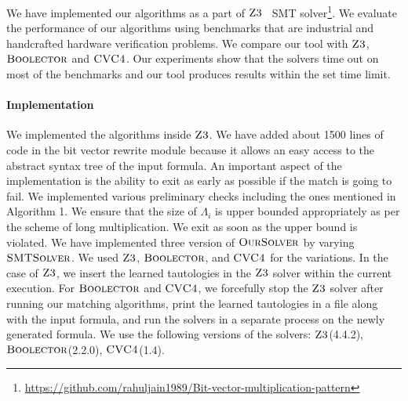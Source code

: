 

We have implemented our algorithms as a part of $\textsc{Z3}$~\cite{z3} SMT solver\footnote{\url{https://github.com/rahuljain1989/Bit-vector-multiplication-pattern}}.
%
 We evaluate the performance of our algorithms using benchmarks that are industrial and handcrafted hardware verification problems.
%
We compare our tool with $\textsc{Z3}$, $\textsc{Boolector}$\cite{boolector} and $\textsc{CVC4}$\cite{cvc4}.
%
Our experiments show that the solvers time out on most of the benchmarks and our tool produces results within the set time limit.

\paragraph{\bf Implementation}
We implemented the algorithms inside $\textsc{Z3}$. We have added about 1500 lines of code in the bit vector rewrite module because it allows an easy access to the abstract syntax tree of the input formula.
%
An important aspect of the implementation is the ability to exit as early as possible if the match is going to fail.
%
We implemented various preliminary checks including the ones mentioned in Algorithm 1. We ensure that the size of $\Lambda_i$ is upper bounded appropriately as per the scheme of long multiplication. We exit as soon as the upper bound is violated. 
%
We have implemented three version of $\textsc{OurSolver}$ by varying
$\textsc{SMTSolver}$.
%
We used  $\textsc{Z3}$, $\textsc{Boolector}$, and $\textsc{CVC4}$ for the variations. 
%
In the case of $\textsc{Z3}$,
we insert the learned tautologies in the $\textsc{Z3}$ solver within the current execution.
%
For $\textsc{Boolector}$ and $\textsc{CVC4}$,
we forcefully stop the $\textsc{Z3}$ solver after running our matching algorithms,
print the learned tautologies in a file along with the input formula, and
run the solvers in a separate process on the newly generated formula. We use the following versions of the solvers: $\textsc{Z3}$(4.4.2), $\textsc{Boolector}$(2.2.0), $\textsc{CVC4}$(1.4).


